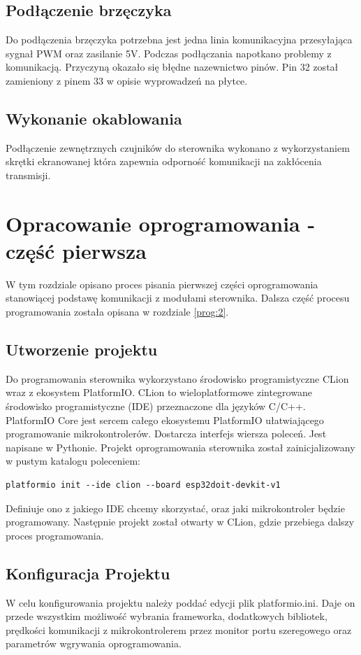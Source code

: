 \documentclass[11pt]{report}
\begin{document}
 \section{Podłączenie brzęczyka}
 Do podłączenia brzęczyka potrzebna jest jedna linia komunikacyjna przesyłająca sygnał PWM oraz zasilanie 5V. Podczas podłączania napotkano problemy z komunikacją. Przyczyną okazało się błędne nazewnictwo pinów. Pin 32 został zamieniony z pinem 33 w opisie wyprowadzeń na płytce.
 
 
 \section{Wykonanie okablowania}
 Podłączenie zewnętrznych czujników do sterownika wykonano z wykorzystaniem skrętki ekranowanej która zapewnia odporność komunikacji na zakłócenia transmisji.
 
 
 \chapter{Opracowanie oprogramowania - część pierwsza}
 W tym rozdziale opisano proces pisania pierwszej części oprogramowania stanowiącej podstawę komunikacji z modułami sterownika. Dalsza część procesu programowania została opisana w rozdziale \ref{prog:2}.
 
 \section{Utworzenie projektu}
 Do programowania sterownika wykorzystano środowisko programistyczne CLion wraz z ekosystem PlatformIO.
 CLion to wieloplatformowe zintegrowane środowisko programistyczne (IDE) przeznaczone dla języków C/C++.
 PlatformIO Core jest sercem całego ekosystemu PlatformIO ułatwiającego programowanie mikrokontrolerów. Dostarcza interfejs wiersza poleceń. Jest napisane w Pythonie.
 Projekt oprogramowania sterownika został zainicjalizowany w pustym katalogu poleceniem:
 \begin{lstlisting}
platformio init --ide clion --board esp32doit-devkit-v1 
 \end{lstlisting}
 Definiuje ono z jakiego IDE chcemy skorzystać, oraz jaki mikrokontroler będzie programowany.
 Następnie projekt został otwarty w CLion, gdzie przebiega dalszy proces programowania.
 
 \section{Konfiguracja Projektu}
 W celu konfigurowania projektu należy poddać edycji plik platformio.ini. Daje on przede wszystkim możliwość wybrania frameworka, dodatkowych bibliotek, prędkości komunikacji z mikrokontrolerem przez monitor portu szeregowego oraz parametrów wgrywania oprogramowania.
 
\end{document}
